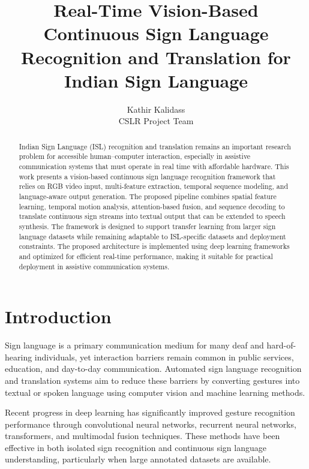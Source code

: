\documentclass[runningheads]{llncs}
\title{Real-Time Vision-Based Continuous Sign Language Recognition and Translation for Indian Sign Language}
\author{Kathir Kalidass\\CSLR Project Team}
\institute{Department of Computer Science and Engineering\\
Project Report Workspace, India\\
\email{kathir@example.com}}
\begin{document}
\maketitle

\begin{abstract}
Indian Sign Language (ISL) recognition and translation remains an important research problem for accessible human--computer interaction, especially in assistive communication systems that must operate in real time with affordable hardware. This work presents a vision-based continuous sign language recognition framework that relies on RGB video input, multi-feature extraction, temporal sequence modeling, and language-aware output generation. The proposed pipeline combines spatial feature learning, temporal motion analysis, attention-based fusion, and sequence decoding to translate continuous sign streams into textual output that can be extended to speech synthesis. The framework is designed to support transfer learning from larger sign language datasets while remaining adaptable to ISL-specific datasets and deployment constraints. The proposed architecture is implemented using deep learning frameworks and optimized for efficient real-time performance, making it suitable for practical deployment in assistive communication systems.

\end{abstract}

\section{Introduction}
Sign language is a primary communication medium for many deaf and hard-of-hearing individuals, yet interaction barriers remain common in public services, education, and day-to-day communication. Automated sign language recognition and translation systems aim to reduce these barriers by converting gestures into textual or spoken language using computer vision and machine learning methods.

Recent progress in deep learning has significantly improved gesture recognition performance through convolutional neural networks, recurrent neural networks, transformers, and multimodal fusion techniques. These methods have been effective in both isolated sign recognition and continuous sign language understanding, particularly when large annotated datasets are available.
\end{document}

